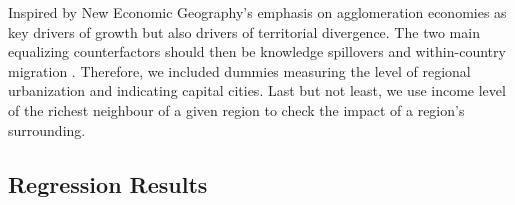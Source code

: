 \documentclass[11pt]{article}
\begin{document}
Inspired by New Economic Geography's emphasis on agglomeration economies as key drivers of growth but also drivers of territorial divergence. The two main equalizing 
counterfactors should then be knowledge spillovers and within-country migration  \citep{iammarino2017regional}. Therefore, we included dummies measuring the level of regional urbanization and indicating capital cities. %
Last but not least, we use income level of the richest neighbour of a given region to check the impact of a region's surrounding.

\subsection{Regression Results}
\end{document}
